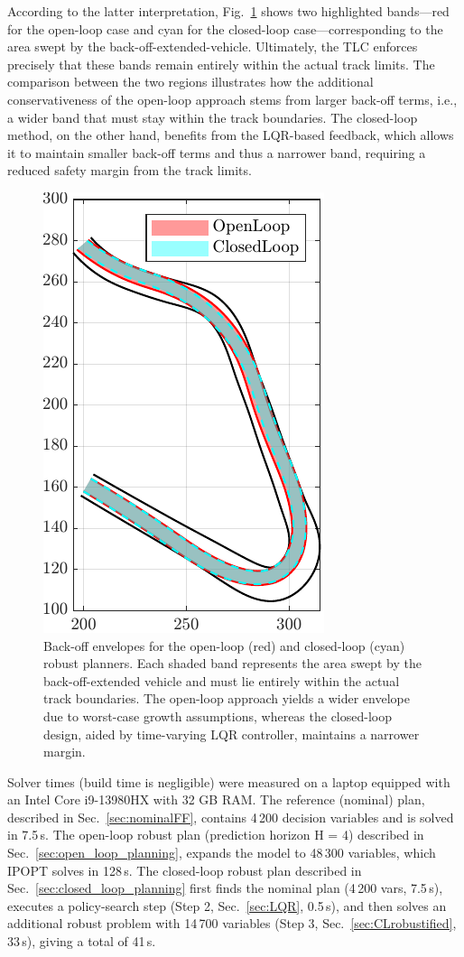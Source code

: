 According to the latter interpretation, Fig.~\ref{fig:olcl_traj_bands} shows two highlighted bands---red for the open-loop case and cyan for the closed-loop case---corresponding to the area swept by the back-off-extended-vehicle. Ultimately, the TLC enforces precisely that these bands remain entirely within the actual track limits. The comparison between the two regions illustrates how the additional conservativeness of the open-loop approach stems from larger back-off terms, i.e., a wider band that must stay within the track boundaries. The closed-loop method, on the other hand, benefits from the LQR-based feedback, which allows it to maintain smaller back-off terms and thus a narrower band, requiring a reduced safety margin from the track limits.
\begin{figure}
	\centering
	\includegraphics{Fig/olcl_traj_bands.pdf}
	\caption{Back-off envelopes for the open-loop (red) and closed-loop (cyan) robust planners. Each shaded band represents the area swept by the back-off-extended vehicle and must lie entirely within the actual track boundaries.
The open-loop approach yields a wider envelope due to worst-case growth assumptions, whereas the closed-loop design, aided by time-varying LQR controller, maintains a narrower margin.}
	\label{fig:olcl_traj_bands}
\end{figure}

Solver times (build time is negligible) were measured on a laptop equipped with an Intel Core i9-13980HX with 32 GB RAM.
The reference (nominal) plan, described in Sec.~\ref{sec:nominalFF}, contains 4\,200 decision variables and is solved in 7.5\,s.
The open-loop robust plan (prediction horizon H = 4) described in Sec.~\ref{sec:open_loop_planning}, expands the model to 48\,300 variables, which IPOPT solves in 128\,s.
The closed-loop robust plan described in Sec.~\ref{sec:closed_loop_planning} first finds the nominal plan (4\,200 vars, 7.5\,s), executes a policy-search step (Step 2, Sec.~\ref{sec:LQR}, 0.5\,s), and then solves an additional robust problem with 14\,700 variables (Step 3, Sec.~\ref{sec:CLrobustified}, 33\,s), giving a total of 41\,s.

